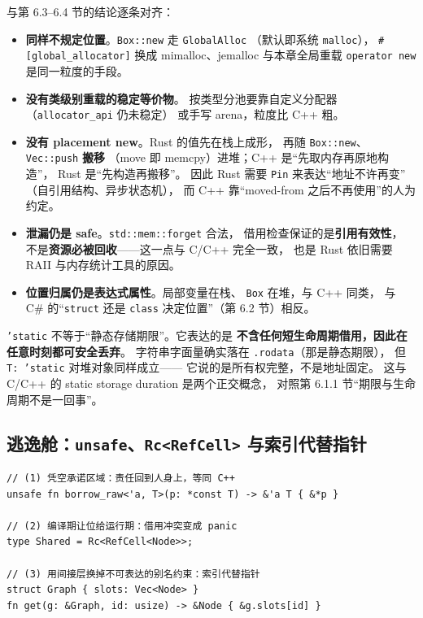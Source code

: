\documentclass[12pt,a4paper,fontset=fandol]{ctexbook}
\begin{document}
与第 6.3--6.4 节的结论逐条对齐：

\begin{itemize}
  \item \textbf{同样不规定位置}。\texttt{Box::new} 走 \texttt{GlobalAlloc}
        （默认即系统 \texttt{malloc}），
        \texttt{\#[global\_\allowbreak{}allocator]} 换成 mimalloc、jemalloc
        与本章全局重载 \texttt{operator new} 是同一粒度的手段。
  \item \textbf{没有类级别重载的稳定等价物}。
        按类型分池要靠自定义分配器（\texttt{allocator\_api} 仍未稳定）
        或手写 arena，粒度比 C++ 粗。
  \item \textbf{没有 placement new}。Rust 的值先在栈上成形，
        再随 \texttt{Box::new}、\texttt{Vec::push} \textbf{搬移}
        （move 即 memcpy）进堆；C++ 是``先取内存再原地构造''，
        Rust 是``先构造再搬移''。
        因此 Rust 需要 \texttt{Pin} 来表达``地址不许再变''
        （自引用结构、异步状态机），
        而 C++ 靠``moved-from 之后不再使用''的人为约定。
  \item \textbf{泄漏仍是 safe}。\texttt{std::mem::forget} 合法，
        借用检查保证的是\textbf{引用有效性}，
        不是\textbf{资源必被回收}——这一点与 C/C++ 完全一致，
        也是 Rust 依旧需要 RAII 与内存统计工具的原因。
  \item \textbf{位置归属仍是表达式属性}。局部变量在栈、
        \texttt{Box} 在堆，与 C++ 同类，
        与 C\# 的``\texttt{struct} 还是 \texttt{class} 决定位置''（第 6.2 节）相反。
\end{itemize}

\begin{note}[title=\texttt{'static} 常被误读]
\texttt{'static} 不等于``静态存储期限''。它表达的是
\textbf{不含任何短生命周期借用，因此在任意时刻都可安全丢弃}。
字符串字面量确实落在 \texttt{.rodata}（那是静态期限），
但 \texttt{T: 'static} 对堆对象同样成立——
它说的是所有权完整，不是地址固定。
这与 C/C++ 的 static storage duration 是两个正交概念，
对照第 6.1.1 节``期限与生命周期不是一回事''。
\end{note}

\subsection{逃逸舱：\texttt{unsafe}、\texttt{Rc<RefCell>} 与索引代替指针}

\begin{lstlisting}[style=ruststyle,caption={三种妥协写法，各自对应一个 C++ 常态}]
// (1) 凭空承诺区域：责任回到人身上，等同 C++
unsafe fn borrow_raw<'a, T>(p: *const T) -> &'a T { &*p }

// (2) 编译期让位给运行期：借用冲突变成 panic
type Shared = Rc<RefCell<Node>>;

// (3) 用间接层换掉不可表达的别名约束：索引代替指针
struct Graph { slots: Vec<Node> }
fn get(g: &Graph, id: usize) -> &Node { &g.slots[id] }
\end{lstlisting}
\end{document}
